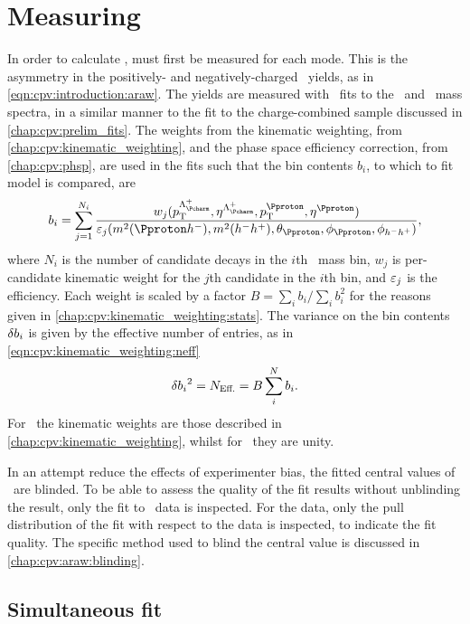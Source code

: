 \chapter{Measuring \texorpdfstring{\ARaw}{ARaw}}
\label{chap:cpv:araw}

In order to calculate \dACP, \ARaw must first be measured for each mode.
This is the asymmetry in the positively- and negatively-charged \PLambdac\ 
yields, as in \cref{eqn:cpv:introduction:araw}.
The yields are measured with \chisq\ fits to the \PLambdac\ and \APLambdac\ 
mass spectra, in a similar manner to the fit to the charge-combined sample 
discussed in \cref{chap:cpv:prelim_fits}.
The weights from the kinematic weighting, from 
\cref{chap:cpv:kinematic_weighting}, and the phase space efficiency correction, 
from \cref{chap:cpv:phsp}, are used in the fits such that the bin contents 
$b_{i}$, to which to fit model is compared, are
\begin{equation}
  b_{i} = \sum_{j = 1}^{N_{i}} \frac{%
    w_{j}(\pT^{\PLambdac}, \Eta^{\PLambdac},
          \pT^{\Pproton}, \Eta^{\Pproton})
  }{%
    \eff_{j}(\msqphm, \msqhh, \thetap, \phip, \phihh)
  },
  \label{eqn:cpv:araw:total_weights}
\end{equation}
where $N_{i}$ is the number of candidate decays in the $i$th \phh\ mass bin, 
$w_{j}$ is per-candidate kinematic weight for the $j$th candidate in the $i$th 
bin, and $\varepsilon_{j}$ is the efficiency.
Each weight is scaled by a factor $B = \sum_{i} b_{i}/\sum_{i} b_{i}^{2}$ for 
the reasons given in \cref{chap:cpv:kinematic_weighting:stats}.
The variance on the bin contents $\delta{b_{i}}$ is given by the effective number 
of entries, as in \cref{eqn:cpv:kinematic_weighting:neff}
\begin{equation}
  \delta{b_{i}}^{2} = N_{\text{Eff.}} = B\sum_{i}^{N} b_{i}.
\end{equation}
For \ppipi\ the kinematic weights are those described in 
\cref{chap:cpv:kinematic_weighting}, whilst for \pKK\ they are unity.

In an attempt reduce the effects of experimenter bias, the fitted central 
values of \ARaw\ are blinded.
To be able to assess the quality of the fit results without unblinding the 
result, only the fit to \PLambdac\ data is inspected.
For the \APLambdac data, only the pull distribution of the fit with respect to 
the data is inspected, to indicate the fit quality.
The specific method used to blind the central value is discussed in 
\cref{chap:cpv:araw:blinding}.

\section{Simultaneous fit}
\label{chap:cpv:araw:simultaneous_fit}

